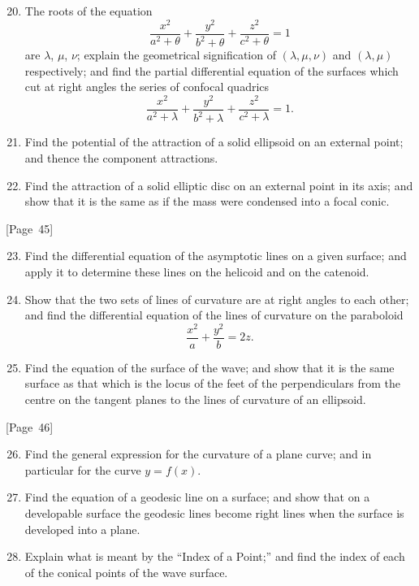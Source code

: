 \documentclass[11pt,a4paper]{article}
\theoremstyle{plain}
\theoremstyle{definition}
\theoremstyle{remark}
\begin{document}
\begin{enumerate}
\setcounter{enumi}{19}
\item The roots of the equation
\[
\frac{x^2}{a^2+\theta} + \frac{y^2}{b^2+\theta} + \frac{z^2}{c^2+\theta} = 1
\]
are $\lambda$, $\mu$, $\nu$; explain the geometrical signification of
$(\lambda,\mu,\nu)$ and $(\lambda,\mu)$ respectively; and find the
partial differential equation of the surfaces which cut at right angles
the series of confocal quadrics
\[
\frac{x^2}{a^2+\lambda} + \frac{y^2}{b^2+\lambda} + \frac{z^2}{c^2+\lambda} = 1.
\]

\item Find the potential of the attraction of a solid ellipsoid on an
external point; and thence the component attractions.

\item Find the attraction of a solid elliptic disc on an external
point in its axis; and show that it is the same as if the mass were
condensed into a focal conic.
\end{enumerate}

\begin{center}
[Page~45]
\end{center}

\begin{enumerate}
\setcounter{enumi}{22}
\item Find the differential equation of the asymptotic lines on a
given surface; and apply it to determine these lines on the helicoid
and on the catenoid.

\item Show that the two sets of lines of curvature are at right angles
to each other; and find the differential equation of the lines of
curvature on the paraboloid
\[
\frac{x^2}{a} + \frac{y^2}{b} = 2z.
\]

\item Find the equation of the surface of the wave; and show that it
is the same surface as that which is the locus of the feet of the
perpendiculars from the centre on the tangent planes to the lines of
curvature of an ellipsoid.
\end{enumerate}

\begin{center}
[Page~46]
\end{center}

\begin{enumerate}
\setcounter{enumi}{25}
\item Find the general expression for the curvature of a plane curve;
and in particular for the curve $y = f(x)$.

\item Find the equation of a geodesic line on a surface; and show that
on a developable surface the geodesic lines become right lines when the
surface is developed into a plane.

\item Explain what is meant by the ``Index of a Point;'' and find the
index of each of the conical points of the wave surface.
\end{enumerate}
\end{document}
